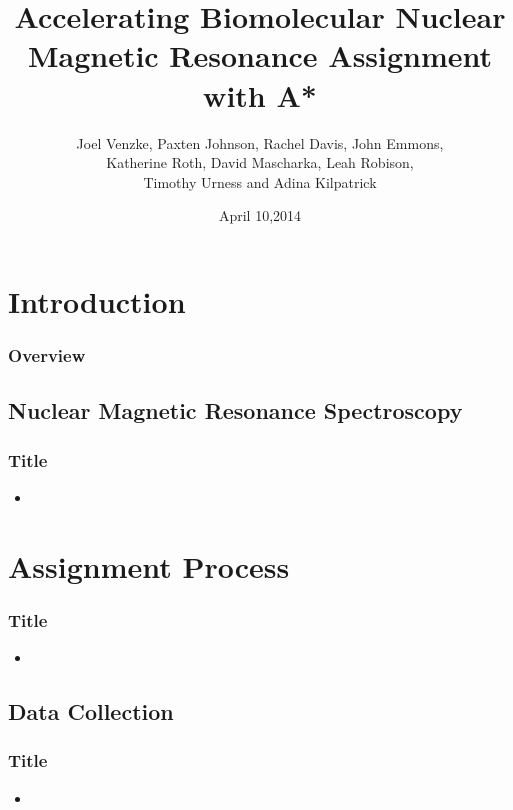 \documentclass{beamer}
\title[NMR Assignment with A*]{Accelerating Biomolecular Nuclear Magnetic Resonance Assignment with A*} %
\author[J. Venzke, P. Johnson, R. Davis, J. Emmons, K. Roth, D. Mascharka, L. Robison, T. Urness, A. Kilpatrick]{Joel Venzke, Paxten Johnson, Rachel Davis, John Emmons,\\ Katherine Roth, David Mascharka, Leah Robison,\\ Timothy Urness and Adina Kilpatrick} %
\institute[Drake University] %
{
Department of Mathematics and Computer Science\\
Drake University\\

\medskip
\textit{joel.venzke@drake.edu} %
}
\date{April 10,2014} %
\begin{document}
\begin{frame}
\titlepage %
\end{frame}

\section{Introduction}
\begin{frame}
\frametitle{Overview} %
\tableofcontents 
\end{frame}


\subsection{Nuclear Magnetic Resonance Spectroscopy} 
\begin{frame}
	\frametitle{Title}
	\begin{itemize}
		\item 
	\end{itemize}
\end{frame}

\section{Assignment Process}
\begin{frame}
	\frametitle{Title}
	\begin{itemize}
		\item 
	\end{itemize}
\end{frame}

\subsection{Data Collection}
\begin{frame}
	\frametitle{Title}
	\begin{itemize}
		\item 
	\end{itemize}
\end{frame}
\end{document}
